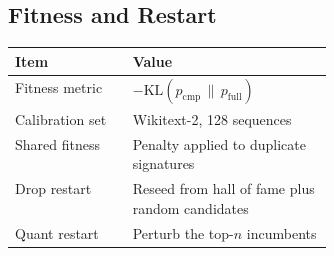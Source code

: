 \begin{multicols}{2}
\subsection{Fitness and Restart}

\begin{cleantable}
\begin{tabularx}{\linewidth}{@{}W{0.37\linewidth}Y@{}}
\toprule
\textbf{Item} & \textbf{Value} \\
\midrule
Fitness metric & $-\mathrm{KL}(p_{\mathrm{cmp}}\,\|\,p_{\mathrm{full}})$ \\
Calibration set & Wikitext-2, 128 sequences \\
Shared fitness & Penalty applied to duplicate signatures \\
Drop restart & Reseed from hall of fame plus random candidates \\
Quant restart & Perturb the top-$n$ incumbents \\
\bottomrule
\end{tabularx}
\end{cleantable}

\end{multicols}
\clearpage
